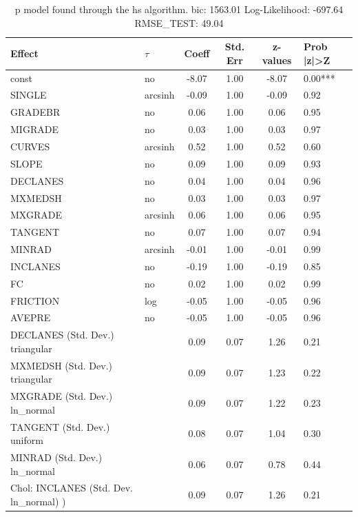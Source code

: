 \begin{table}
	\caption{p model found through the hs algorithm. bic: 1563.01 Log-Likelihood: -697.64 RMSE_TEST: 49.04}
	\begin{center}
		\begin{tabular}{|l|l|c|c|c|l|}
			\hline
			Effect & $\tau$ & Coeff & Std. Err & z-values & Prob |z|>Z \\
			\hline
			const & no & -8.07 & 1.00 & -8.07 & 0.00*** \\
			\hline
			SINGLE & arcsinh & -0.09 & 1.00 & -0.09 & 0.92 \\
			\hline
			GRADEBR & no & 0.06 & 1.00 & 0.06 & 0.95 \\
			\hline
			MIGRADE & no & 0.03 & 1.00 & 0.03 & 0.97 \\
			\hline
			CURVES & arcsinh & 0.52 & 1.00 & 0.52 & 0.60 \\
			\hline
			SLOPE & no & 0.09 & 1.00 & 0.09 & 0.93 \\
			\hline
			DECLANES & no & 0.04 & 1.00 & 0.04 & 0.96 \\
			\hline
			MXMEDSH & no & 0.03 & 1.00 & 0.03 & 0.97 \\
			\hline
			MXGRADE & arcsinh & 0.06 & 1.00 & 0.06 & 0.95 \\
			\hline
			TANGENT & no & 0.07 & 1.00 & 0.07 & 0.94 \\
			\hline
			MINRAD & arcsinh & -0.01 & 1.00 & -0.01 & 0.99 \\
			\hline
			INCLANES & no & -0.19 & 1.00 & -0.19 & 0.85 \\
			\hline
			FC & no & 0.02 & 1.00 & 0.02 & 0.99 \\
			\hline
			FRICTION & log & -0.05 & 1.00 & -0.05 & 0.96 \\
			\hline
			AVEPRE & no & -0.05 & 1.00 & -0.05 & 0.96 \\
			\hline
			DECLANES (Std. Dev.) triangular &  & 0.09 & 0.07 & 1.26 & 0.21 \\
			\hline
			MXMEDSH (Std. Dev.) triangular &  & 0.09 & 0.07 & 1.23 & 0.22 \\
			\hline
			MXGRADE (Std. Dev.) ln_normal &  & 0.09 & 0.07 & 1.22 & 0.23 \\
			\hline
			TANGENT (Std. Dev.) uniform &  & 0.08 & 0.07 & 1.04 & 0.30 \\
			\hline
			MINRAD (Std. Dev.) ln_normal &  & 0.06 & 0.07 & 0.78 & 0.44 \\
			\hline
			 Chol: INCLANES (Std. Dev. ln_normal) ) &  & 0.09 & 0.07 & 1.26 & 0.21 \\
			\hline

\end{tabular}
\end{center}
\end{table}
